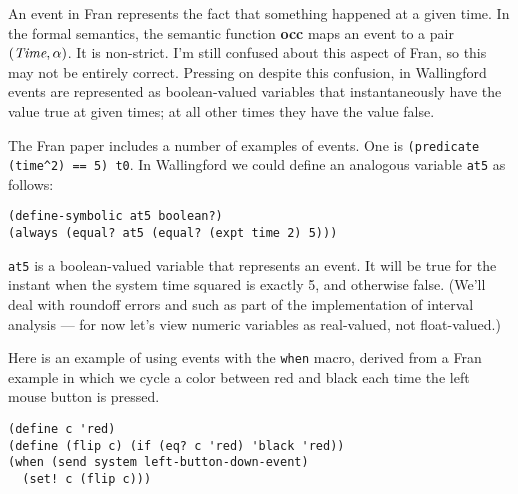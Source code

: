 \documentclass{article}
\begin{document}
An event in Fran represents the fact that something happened at a
given time.  In the formal semantics, the semantic function {\bf occ}
maps an event to a pair $(\emph{Time},\alpha)$.  It is non-strict.
I'm still confused about this aspect of Fran, so this may not be
entirely correct.  Pressing on despite this confusion, in Wallingford
events are represented as boolean-valued variables that
instantaneously have the value true at given times; at all other times
they have the value false.

The Fran paper includes a number of examples of events.  One is
\verb|(predicate (time^2) == 5) t0|.  In Wallingford we could
define an analogous variable \verb|at5| as follows:

\begin{verbatim}
(define-symbolic at5 boolean?)
(always (equal? at5 (equal? (expt time 2) 5)))
\end{verbatim}

\verb|at5| is a boolean-valued variable that represents an event.  It
will be true for the instant when the system time squared is exactly
5, and otherwise false.  (We'll deal with roundoff errors and such as
part of the implementation of interval analysis --- for now let's view
numeric variables as real-valued, not float-valued.)




Here is an example of using events with the \verb|when| macro, derived from
a Fran example in which we cycle a color between red and black each time
the left mouse button is pressed.

\begin{verbatim}
(define c 'red)
(define (flip c) (if (eq? c 'red) 'black 'red))
(when (send system left-button-down-event)
  (set! c (flip c)))
\end{verbatim}
\end{document}
